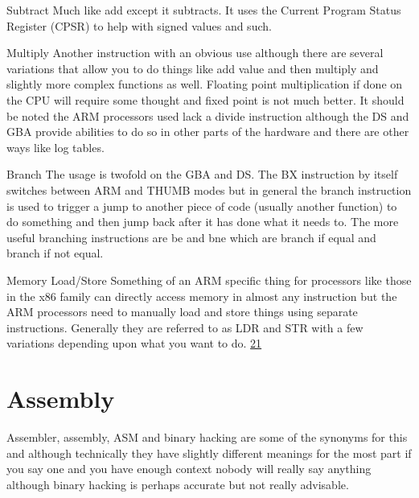 \documentclass[
]{book}
\begin{document}
Subtract Much like add except it subtracts. It uses the Current Program Status Register (CPSR) to help with signed values and such.

Multiply Another instruction with an obvious use although there are several variations that allow you to do things like add value and then multiply and slightly more complex functions as well. Floating point multiplication if done on the CPU will require some thought and fixed point is not much better. It should be noted the ARM processors used lack a divide instruction although the DS and GBA provide abilities to do so in other parts of the hardware and there are other ways like log tables.

Branch The usage is twofold on the GBA and DS. The BX instruction by itself switches between ARM and THUMB modes but in general the branch instruction is used to trigger a jump to another piece of code (usually another function) to do something and then jump back after it has done what it needs to. The more useful branching instructions are be and bne which are branch if equal and branch if not equal.

Memory Load/Store Something of an ARM specific thing for processors like those in the x86 family can directly access memory in almost any instruction but the ARM processors need to manually load and store things using separate instructions. Generally they are referred to as LDR and STR with a few variations depending upon what you want to do. \href{romhacking202022.html\#fn21x0}{21}

\hypertarget{assembly}{%
\section{Assembly}\label{assembly}}

Assembler, assembly, ASM and binary hacking are some of the synonyms for this and although technically they have slightly different meanings for the most part if you say one and you have enough context nobody will really say anything although binary hacking is perhaps accurate but not really advisable.
\end{document}
